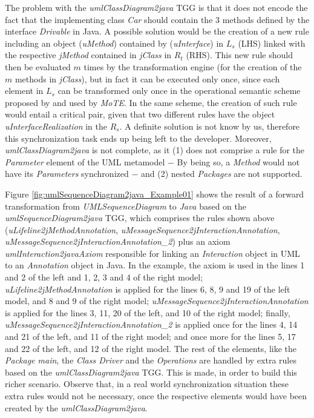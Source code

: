 \documentclass[tuberlin,cic,tc,english,noabntcite, oneside]{iiufrgs}
\begin{document}
The problem with the \emph{umlClassDiagram2java} TGG is that it does not encode the fact that the implementing class \emph{Car} should contain the $3$ methods defined by the interface \emph{Drivable} in Java. A possible solution would be the creation of a new rule including an object (\emph{uMethod}) contained by (\emph{uInterface}) in $L_s$ (LHS) linked with the respective \emph{jMethod} contained in \emph{jClass} in $R_t$ (RHS). This new rule should then be evaluated $m$ times by the transformation engine (for the creation of the $m$ methods in \emph{jClass}), but in fact it can be executed only once, since each element in $L_s$ can be transformed only once in the operational semantic scheme proposed by \citet[p. 9]{giese2010toward} and used by \emph{MoTE}. In the same scheme, the creation of such rule would entail a critical pair, given that two different rules have the object \emph{uInterfaceRealization} in the $R_s$. A definite solution is not know by us, therefore this synchronization task ends up being left to the developer. Moreover, \emph{umlClassDiagram2java} is not complete, as it (1) does not comprise a rule for the \emph{Parameter} element of the UML metamodel $-$ By being so, a \emph{Method} would not have its \emph{Parameters} synchronized $-$ and (2) nested \emph{Packages} are not supported.

Figure \ref{fig:umlSequenceDiagram2java_Example01} shows the result of a forward transformation from \emph{UMLSequenceDiagram} to \emph{Java} based on the \emph{umlSequenceDiagram2java} TGG, which comprises the rules shown above (\emph{uLifeline2jMethodAnnotation}, \emph{uMessageSequence2jInteractionAnnotation}, \emph{uMessageSequence2jInteractionAnnotation\_2}) plus an axiom \emph{umlInteraction2javaAxiom} responsible for linking an \emph{Interaction} object in UML to an \emph{Annotation} object in Java. In the example, the axiom is used in the lines 1 and 2 of the left and 1, 2, 3 and 4 of the right model; \emph{uLifeline2jMethodAnnotation} is applied for the lines 6, 8, 9 and 19 of the left model, and 8 and 9 of the right model;  \emph{uMessageSequence2jInteractionAnnotation} is applied for the lines 3, 11, 20 of the left, and 10 of the right model; finally, \emph{uMessageSequence2jInteractionAnnotation\_2} is applied once for the lines 4, 14 and 21 of the left, and 11 of the right model; and once more for the lines 5, 17 and 22 of the left, and 12 of the right model. The rest of the elements, like the \emph{Package main}, the \emph{Class Driver} and the \emph{Operations} are handled by extra rules based on the \emph{umlClassDiagram2java} TGG. This is made, in order to build this richer scenario. Observe that, in a real world synchronization situation these extra rules would not be necessary, once the respective elements would have been created by the \emph{umlClassDiagram2java}.
\end{document}
